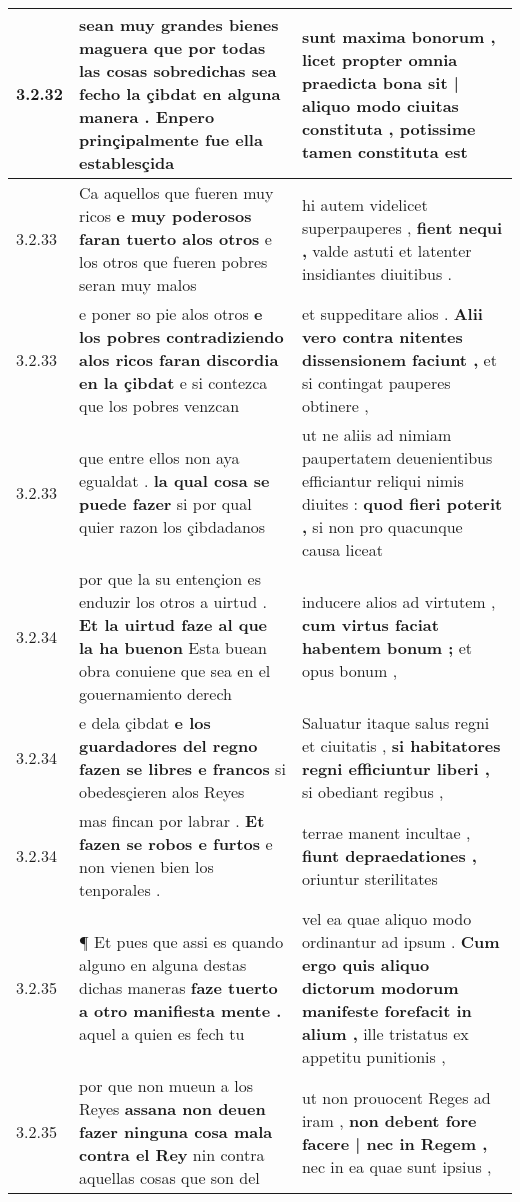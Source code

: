 \begin{tabular}{|p{1cm}|p{6.5cm}|p{6.5cm}|}
3.2.32 & sean muy grandes bienes \textbf{ maguera que por todas las cosas sobredichas sea fecho la çibdat en alguna manera . } Enpero prinçipalmente fue ella establesçida & sunt maxima bonorum , \textbf{ licet propter omnia praedicta bona sit | aliquo modo ciuitas constituta , } potissime tamen constituta est \\\hline
3.2.33 & Ca aquellos que fueren muy ricos \textbf{ e muy poderosos faran tuerto alos otros } e los otros que fueren pobres seran muy malos & hi autem videlicet superpauperes , \textbf{ fient nequi , } valde astuti et latenter insidiantes diuitibus . \\\hline
3.2.33 & e poner so pie alos otros \textbf{ e los pobres contradiziendo alos ricos faran discordia en la çibdat } e si contezca que los pobres venzcan & et suppeditare alios . \textbf{ Alii vero contra nitentes dissensionem faciunt , } et si contingat pauperes obtinere , \\\hline
3.2.33 & que entre ellos non aya egualdat . \textbf{ la qual cosa se puede fazer } si por qual quier razon los çibdadanos & ut ne aliis ad nimiam paupertatem deuenientibus efficiantur reliqui nimis diuites : \textbf{ quod fieri poterit , } si non pro quacunque causa liceat \\\hline
3.2.34 & por que la su entençion es enduzir los otros a uirtud . \textbf{ Et la uirtud faze al que la ha buenon } Esta buean obra conuiene que sea en el gouernamiento derech & inducere alios ad virtutem , \textbf{ cum virtus faciat habentem bonum ; } et opus bonum , \\\hline
3.2.34 & e dela çibdat \textbf{ e los guardadores del regno fazen se libres e francos } si obedesçieren alos Reyes & Saluatur itaque salus regni et ciuitatis , \textbf{ si habitatores regni efficiuntur liberi , } si obediant regibus , \\\hline
3.2.34 & mas fincan por labrar . \textbf{ Et fazen se robos e furtos } e non vienen bien los tenporales . & terrae manent incultae , \textbf{ fiunt depraedationes , } oriuntur sterilitates \\\hline
3.2.35 & ¶ Et pues que assi es quando alguno en alguna destas dichas maneras \textbf{ faze tuerto a otro manifiesta mente . } aquel a quien es fech tu & vel ea quae aliquo modo ordinantur ad ipsum . \textbf{ Cum ergo quis aliquo dictorum modorum manifeste forefacit in alium , } ille tristatus ex appetitu punitionis , \\\hline
3.2.35 & por que non mueun a los Reyes \textbf{ assana non deuen fazer ninguna cosa mala contra el Rey } nin contra aquellas cosas que son del & ut non prouocent Reges ad iram , \textbf{ non debent fore facere | nec in Regem , } nec in ea quae sunt ipsius , \\\hline

\end{tabular}
